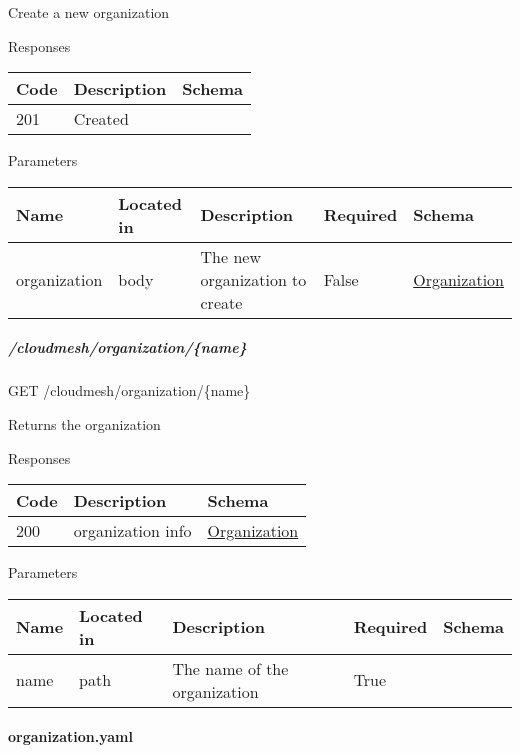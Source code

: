 \documentclass[9pt,]{article}
\let\oldparagraph\paragraph
\renewcommand{\paragraph}[1]{\oldparagraph{#1}\mbox{}}
\let\oldsubparagraph\subparagraph
\renewcommand{\subparagraph}[1]{\oldsubparagraph{#1}\mbox{}}
\begin{document}
Create a new organization

Responses

\begin{longtable}[]{@{}lll@{}}
\toprule
Code & Description & Schema\tabularnewline
\midrule
\endhead
201 & Created &\tabularnewline
\bottomrule
\end{longtable}

Parameters

\begin{longtable}[]{@{}lllll@{}}
\toprule
Name & Located in & Description & Required & Schema\tabularnewline
\midrule
\endhead
organization & body & The new organization to create & False &
\protect\hyperlink{organization}{Organization}\tabularnewline
\bottomrule
\end{longtable}

\hypertarget{cloudmeshorganizationname}{%
\subparagraph{/cloudmesh/organization/\{name\}}\label{cloudmeshorganizationname}}

GET /cloudmesh/organization/\{name\}

Returns the organization

Responses

\begin{longtable}[]{@{}lll@{}}
\toprule
Code & Description & Schema\tabularnewline
\midrule
\endhead
200 & organization info &
\protect\hyperlink{organization}{Organization}\tabularnewline
\bottomrule
\end{longtable}

Parameters

\begin{longtable}[]{@{}lllll@{}}
\toprule
Name & Located in & Description & Required & Schema\tabularnewline
\midrule
\endhead
name & path & The name of the organization & True &\tabularnewline
\bottomrule
\end{longtable}

\hypertarget{organization.yaml}{%
\paragraph{organization.yaml}\label{organization.yaml}}
\end{document}
